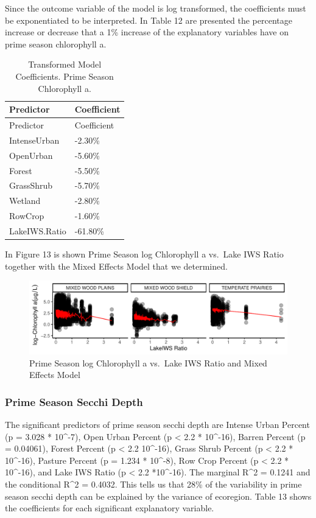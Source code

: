 \documentclass[12pt,]{article}
\begin{document}
Since the outcome variable of the model is log transformed, the
coefficients must be exponentiated to be interpreted. In Table 12 are
presented the percentage increase or decrease that a 1\% increase of the
explanatory variables have on prime season chlorophyll a.

\newpage

\begin{longtable}[]{@{}ll@{}}
\caption{Transformed Model Coefficients. Prime Season Chlorophyll
a.}\tabularnewline
\toprule
Predictor & Coefficient\tabularnewline
\midrule
\endfirsthead
\toprule
Predictor & Coefficient\tabularnewline
\midrule
\endhead
IntenseUrban & -2.30\%\tabularnewline
OpenUrban & -5.60\%\tabularnewline
Forest & -5.50\%\tabularnewline
GrassShrub & -5.70\%\tabularnewline
Wetland & -2.80\%\tabularnewline
RowCrop & -1.60\%\tabularnewline
LakeIWS.Ratio & -61.80\%\tabularnewline
\bottomrule
\end{longtable}

In Figure 13 is shown Prime Season log Chlorophyll a vs.~Lake IWS Ratio
together with the Mixed Effects Model that we determined.

\begin{figure}
\centering
\includegraphics{Bollt_Greif_Raby_Roth_Project_Final_files/figure-latex/unnamed-chunk-26-1.pdf}
\caption{Prime Season log Chlorophyll a vs.~Lake IWS Ratio and Mixed
Effects Model}
\end{figure}

\hypertarget{prime-season-secchi-depth}{%
\subsubsection{Prime Season Secchi
Depth}\label{prime-season-secchi-depth}}

The significant predictors of prime season secchi depth are Intense
Urban Percent (p = 3.028 * 10\^{}-7), Open Urban Percent (p \textless{}
2.2 * 10\^{}-16), Barren Percent (p = 0.04061), Forest Percent (p
\textless{} 2.2 10\^{}-16), Grass Shrub Percent (p \textless{} 2.2 *
10\^{}-16), Pasture Percent (p = 1.234 * 10\^{}-8), Row Crop Percent (p
\textless{} 2.2 * 10\^{}-16), and Lake IWS Ratio (p \textless{} 2.2
*10\^{}-16). The marginal R\^{}2 = 0.1241 and the conditional R\^{}2 =
0.4032. This tells us that 28\% of the variability in prime season
secchi depth can be explained by the variance of ecoregion. Table 13
shows the coefficients for each significant explanatory variable.
\end{document}
